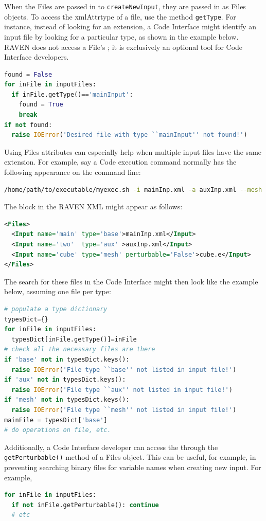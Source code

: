 When the Files are passed in to \texttt{createNewInput}, they are passed in as Files objects. To access the xmlAttr{type} of a file, use the method \texttt{getType}.  For instance, instead of looking for an extension, a Code Interface might identify an input file by looking for a particular type, as shown in the example below. \nb RAVEN does not access a File's ; it is exclusively an optional tool for Code Interface developers.

\begin{lstlisting}[language=python,showstringspaces=false]
found = False
for inFile in inputFiles:
  if inFile.getType()=='mainInput':
    found = True
    break
if not found:
  raise IOError('Desired file with type ``mainInput'' not found!')
\end{lstlisting}
Using Files  attributes can especially help when multiple input files have the same extension.  For example, say a Code execution command normally has the following appearance on the command line:
\begin{lstlisting}[language=bash]
/home/path/to/executable/myexec.sh -i mainInp.xml -a auxInp.xml --mesh cube.e
\end{lstlisting}
The  block in the RAVEN XML might appear as follows:
\begin{lstlisting}[language=XML]
<Files>
  <Input name='main' type='base'>mainInp.xml</Input>
  <Input name='two'  type='aux' >auxInp.xml</Input>
  <Input name='cube' type='mesh' perturbable='False'>cube.e</Input>
</Files>
\end{lstlisting}
The search for these files in the Code Interface might then look like the example below, assuming one file per type:
\begin{lstlisting}[language=python,showstringspaces=false]
# populate a type dictionary
typesDict={}
for inFile in inputFiles:
  typesDict[inFile.getType()]=inFile
# check all the necessary files are there
if 'base' not in typesDict.keys():
  raise IOError('File type ``base'' not listed in input file!')
if 'aux' not in typesDict.keys():
  raise IOError('File type ``aux'' not listed in input file!')
if 'mesh' not in typesDict.keys():
  raise IOError('File type ``mesh'' not listed in input file!')
mainFile = typesDict['base']
# do operations on file, etc.
\end{lstlisting}

Additionally, a Code Interface developer can access the  through the \texttt{getPerturbable()} method of a Files object.  This can be useful, for example, in preventing searching binary files for variable names when creating new input. For example,
\begin{lstlisting}[language=python]
for inFile in inputFiles:
  if not inFile.getPerturbable(): continue
  # etc
\end{lstlisting}
